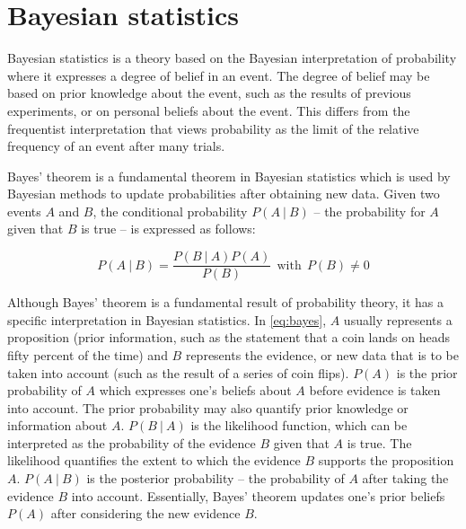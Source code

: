 \section{Bayesian statistics}

Bayesian statistics is a theory based on the Bayesian interpretation of probability where it expresses a degree of belief in an event. The degree of belief may be based on prior knowledge about the event, such as the results of previous experiments, or on personal beliefs about the event. This differs from the frequentist interpretation that views probability as the limit of the relative frequency of an event after many trials.\cite{bayes_1}

Bayes' theorem is a fundamental theorem in Bayesian statistics which is used by Bayesian methods to update probabilities after obtaining new data. Given two events $A$ and $B$, the conditional probability $P(A\ |\ B)$ -- the probability for $A$ given that $B$ is true -- is expressed as follows:

\begin{equation}
\label{eq:bayes}
    P(A\ |\ B) = \frac{P(B\ |\ A) P(A)}{P(B)} \ \ \textrm{with} \ \ P(B) \ne 0
\end{equation}

Although Bayes' theorem is a fundamental result of probability theory, it has a specific interpretation in Bayesian statistics. In \ref{eq:bayes}, $A$ usually represents a proposition (prior information, such as the statement that a coin lands on heads fifty percent of the time) and $B$ represents the evidence, or new data that is to be taken into account (such as the result of a series of coin flips). $P(A)$ is the prior probability of $A$ which expresses one's beliefs about $A$ before evidence is taken into account. The prior probability may also quantify prior knowledge or information about $A$. $P(B\ |\ A)$ is the likelihood function, which can be interpreted as the probability of the evidence $B$ given that $A$ is true. The likelihood quantifies the extent to which the evidence $B$ supports the proposition $A$. $P(A\ |\ B)$ is the posterior probability -- the probability of $A$ after taking the evidence $B$ into account. Essentially, Bayes' theorem updates one's prior beliefs $P(A)$ after considering the new evidence $B$.\cite{bayes_1}
